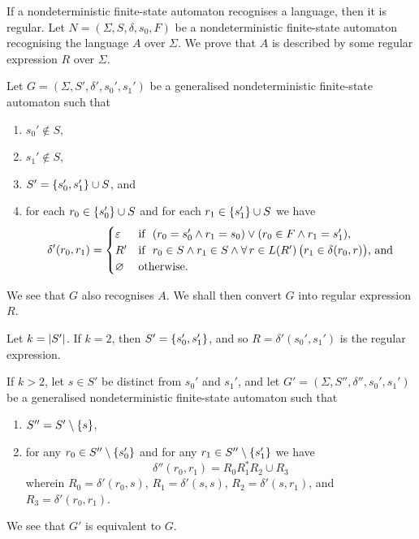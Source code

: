\Blm
    \label{lem2}
    If a nondeterministic finite-state automaton recognises a language, then it
    is regular.
\Elm
\Bpr
    Let \(N = (\varSigma, S, \delta, s_0, F)\) be a nondeterministic
    finite-state automaton recognising the language \(A\) over \(\varSigma\). We
    prove that \(A\) is described by some regular expression \(R\) over
    \(\varSigma\).

    Let \(G = (\varSigma, S', \delta', s_0', s_1')\) be a generalised
    nondeterministic finite-state automaton such that
    \begin{enumerate}
        \item \(s_0' \not\in S\),
        \item \(s_1' \not\in S\),
        \item \(S' = \{s_0', s_1'\} \cup S\), and
        \item for each \(r_0 \in \{s_0'\} \cup S\) and for each \(r_1 \in
        \{s_1'\} \cup S\) we have
            \[
                \delta'(r_0, r_1) = \begin{cases}
                        \varepsilon & \text{if }\ (r_0 = s_0' \land r_1 = s_0)
                        \lor (r_0 \in F \land r_1 = s_1'),\\
                        R' & \text{if }\ r_0 \in S \land r_1 \in S \land \forall
                        \, r \in L(R') \, \big(r_1 \in \delta(r_0, r)\big)
                        \text{, and}\\
                        \varnothing & \text{otherwise.}
                    \end{cases}
            \]
    \end{enumerate}
    We see that \(G\) also recognises \(A\). We shall then convert \(G\) into
    regular expression \(R\).

    Let \(k = \lvert S'\rvert\). If \(k = 2\), then \(S' = \{s_0', s_1'\}\), and
    so \(R = \delta'(s_0', s_1')\) is the regular expression.

    If \(k > 2\), let \(s \in S'\) be distinct from \(s_0'\) and \(s_1'\), and
    let \(G' = (\varSigma, S'', \delta'', s_0', s_1')\) be a generalised
    nondeterministic finite-state automaton such that
    \begin{enumerate}
        \item \(S'' = S' \setminus \{s\}\),
        \item for any \(r_0 \in S'' \setminus \{s_0'\}\) and for any \(r_1
        \in S'' \setminus \{s_1'\}\) we have
        \[
            \delta''(r_0, r_1) = R_0 R_1^* R_2 \cup R_3
        \]
        wherein \(R_0 = \delta'(r_0, s)\), \(R_1 = \delta'(s, s)\), \(R_2 =
        \delta'(s, r_1)\), and \(R_3 = \delta'(r_0, r_1)\).
    \end{enumerate}
    We see that \(G'\) is equivalent to \(G\).

